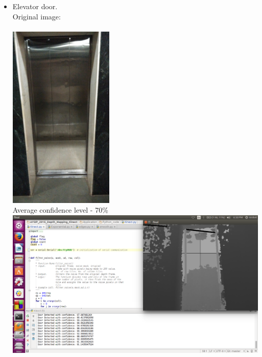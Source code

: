\documentclass{report}
\begin{document}
\begin{itemize}
 \item Elevator door. \\
  Original image: \\ \\
 \includegraphics[width = 5cm]{Elevator.jpg} \\
 Average confidence level - 70\% \\
 \includegraphics[width = 15cm]{lift.png} \\
 

\end{itemize}
\end{document}
